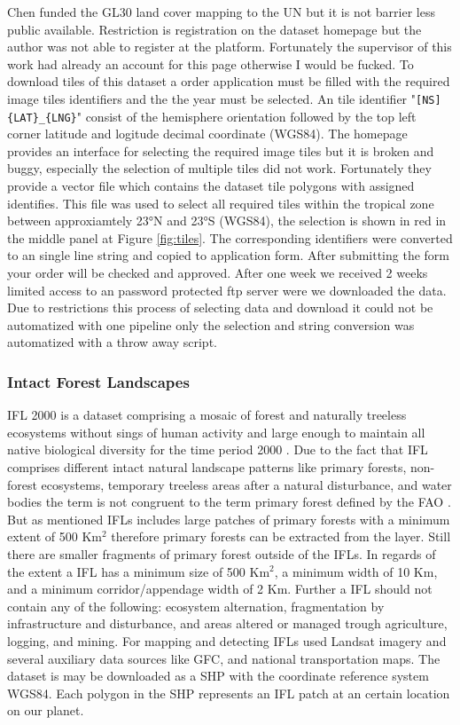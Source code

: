 			Chen funded the \ac{GL30} land cover mapping to the UN but it is not barrier less public available. Restriction is registration on the dataset homepage but the author was not able to register at the platform. Fortunately the supervisor of this work had already an account for this page otherwise I would be fucked. To download tiles of this dataset a order application must be filled with the required image tiles identifiers and the the year must be selected. An tile identifier "\verb|[NS]{LAT}_{LNG}|" consist of the hemisphere orientation followed by the top left corner latitude and logitude decimal coordinate (\ac{WGS84}). The homepage provides an interface for selecting the required image tiles but it is broken and buggy, especially the selection of multiple tiles did not work. Fortunately they provide a vector file which contains the dataset tile polygons with assigned identifies. This file was used to select all required tiles within the tropical zone between approxiamtely 23°N and 23°S (\ac{WGS84}), the selection is shown in red in the middle panel at Figure \ref{fig:tiles}. The corresponding identifiers were converted to an single line string and copied to application form. After submitting the form your order will be checked and approved. After one week we received 2 weeks limited access to an password protected ftp server were we downloaded the data. Due to restrictions this process of selecting data and download it could not be automatized with one pipeline only the selection and string conversion was automatized with a throw away script.

		\subsubsection{Intact Forest Landscapes}
			\ac{IFL} 2000 is a dataset comprising a mosaic of forest and naturally treeless ecosystems without sings of human activity and large enough to maintain all native biological diversity for the time period 2000 \citep{Potapov2017}. Due to the fact that \ac{IFL} comprises different intact natural landscape patterns like primary forests, non-forest ecosystems, temporary treeless areas after a natural disturbance, and water bodies the term is not congruent to the term primary forest defined by the \ac{FAO} \citep{FAO2012}. But as mentioned \ac{IFL}s includes large patches of primary forests with a minimum extent of 500 Km$^2$ therefore primary forests can be extracted from the layer. Still there are smaller fragments of primary forest outside of the \ac{IFL}s. In regards of the extent a \ac{IFL} has a minimum size of 500 Km$^2$, a minimum width of 10 Km, and a minimum corridor/appendage width of 2 Km. Further a \ac{IFL} should not contain any of the following: ecosystem alternation, fragmentation by infrastructure and disturbance, and areas altered or managed trough agriculture, logging, and mining. For mapping and detecting \ac{IFL}s \citeauthor{Potapov2017} used Landsat imagery and several auxiliary data sources like \ac{GFC}, and national transportation maps. The dataset is may be downloaded as a \ac{SHP} with the coordinate reference system \ac{WGS84}. Each polygon in the \ac{SHP} represents an \ac{IFL} patch at an certain location on our planet.

